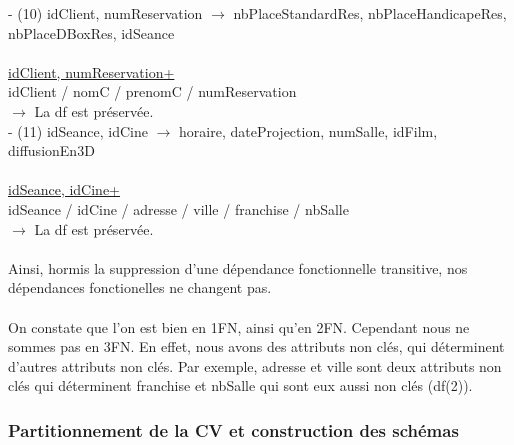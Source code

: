 \documentclass[a4paper,sffamily,12pt]{article}
\begin{document}
					\noindent - (10) idClient, numReservation $\rightarrow$ nbPlaceStandardRes, nbPlaceHandicapeRes, nbPlaceDBoxRes, idSeance \\
						\\
						\underline{idClient, numReservation+} \\
						idClient / nomC / prenomC / numReservation \\									
					$\rightarrow$ La df est préservée. \\		
	
					\noindent - (11) idSeance, idCine $\rightarrow$ horaire, dateProjection, numSalle, idFilm, diffusionEn3D \\
						\\
						\underline{idSeance, idCine+} \\
						idSeance / idCine / adresse / ville / franchise / nbSalle \\							
					$\rightarrow$ La df est préservée. \\							
					\\		
					
					\indent Ainsi, hormis la suppression d'une dépendance fonctionnelle transitive, nos dépendances fonctionelles ne changent pas. \\																
					\\
					\indent On constate que l'on est bien en 1FN, ainsi qu'en 2FN. Cependant nous ne sommes pas en 3FN. En effet, nous avons des attributs non clés, qui déterminent d'autres attributs non clés. Par exemple, adresse et ville sont deux attributs non clés qui déterminent franchise et nbSalle qui sont eux aussi non clés (df(2)). \\
					
					\vspace{0.5cm}
														
				\subsubsection{Partitionnement de la CV et construction des schémas} 	
				
					\vspace{0.5cm}
				
\end{document}

